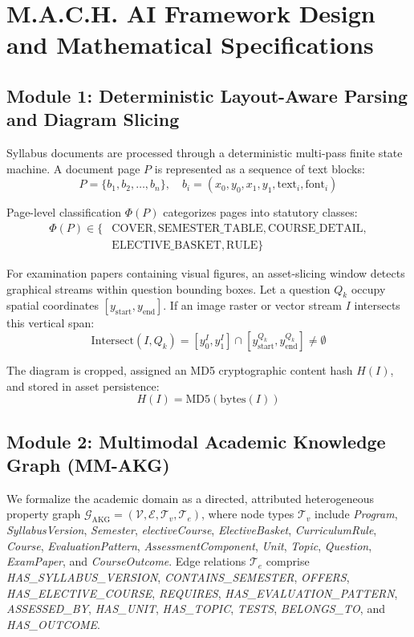 \documentclass[conference]{IEEEtran}
\begin{document}
\section{M.A.C.H. AI Framework Design and Mathematical Specifications}

\subsection{Module 1: Deterministic Layout-Aware Parsing and Diagram Slicing}
Syllabus documents are processed through a deterministic multi-pass finite state machine. A document page $P$ is represented as a sequence of text blocks:
\begin{equation}
P = \{b_1, b_2, \dots, b_n\}, \quad b_i = (x_0, y_0, x_1, y_1, \text{text}_i, \text{font}_i)
\end{equation}

Page-level classification $\Phi(P)$ categorizes pages into statutory classes:
\begin{equation}
\begin{split}
\Phi(P) \in \{ & \text{COVER}, \text{SEMESTER\_TABLE}, \text{COURSE\_DETAIL}, \\
& \text{ELECTIVE\_BASKET}, \text{RULE} \}
\end{split}
\end{equation}

For examination papers containing visual figures, an asset-slicing window detects graphical streams within question bounding boxes. Let a question $Q_k$ occupy spatial coordinates $[y_{\text{start}}, y_{\text{end}}]$. If an image raster or vector stream $I$ intersects this vertical span:
\begin{equation}
\text{Intersect}(I, Q_k) = [y_0^I, y_1^I] \cap [y_{\text{start}}^{Q_k}, y_{\text{end}}^{Q_k}] \neq \emptyset
\end{equation}

The diagram is cropped, assigned an MD5 cryptographic content hash $H(I)$, and stored in asset persistence:
\begin{equation}
H(I) = \text{MD5}(\text{bytes}(I))
\end{equation}

\subsection{Module 2: Multimodal Academic Knowledge Graph (MM-AKG)}
We formalize the academic domain as a directed, attributed heterogeneous property graph $\mathcal{G}_{\text{AKG}} = (\mathcal{V}, \mathcal{E}, \mathcal{T}_v, \mathcal{T}_e)$, where node types $\mathcal{T}_v$ include \textit{Program}, \textit{SyllabusVersion}, \textit{Semester}, \textit{electiveCourse}, \textit{ElectiveBasket}, \textit{CurriculumRule}, \textit{Course}, \textit{EvaluationPattern}, \textit{AssessmentComponent}, \textit{Unit}, \textit{Topic}, \textit{Question}, \textit{ExamPaper}, and \textit{CourseOutcome}. Edge relations $\mathcal{T}_e$ comprise \textit{HAS\_SYLLABUS\_VERSION}, \textit{CONTAINS\_SEMESTER}, \textit{OFFERS}, \textit{HAS\_ELECTIVE\_COURSE}, \textit{REQUIRES}, \textit{HAS\_EVALUATION\_PATTERN}, \textit{ASSESSED\_BY}, \textit{HAS\_UNIT}, \textit{HAS\_TOPIC}, \textit{TESTS}, \textit{BELONGS\_TO}, and \textit{HAS\_OUTCOME}.
\end{document}
